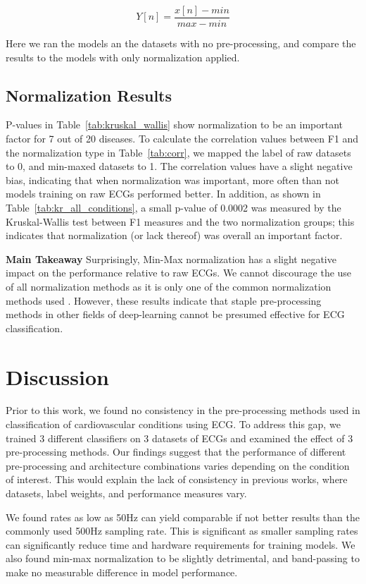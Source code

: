\documentclass[pmlr,twocolumn]{jmlr}%
\begin{document}
\[ Y[n] = \frac{x[n]-min}{max-min} \]

Here we ran the models an the datasets with no pre-processing, and compare the results to the models with only normalization applied.

\subsection{Normalization Results}
P-values in Table~\ref{tab:kruskal_wallis} show normalization to be an important factor for 7 out of 20 diseases. To calculate the correlation values between F1 and the normalization type in Table~\ref{tab:corr}, we mapped the label of raw datasets to 0, and min-maxed datasets to 1. The correlation values have a slight negative bias, indicating that when normalization was important, more often than not models training on raw ECGs performed better. In addition, as shown in Table~\ref{tab:kr_all_conditions}, a small p-value of 0.0002 was measured by the Kruskal-Wallis test between F1 measures and the two normalization groups; this indicates that normalization (or lack thereof) was overall an important factor.

\textbf{Main Takeaway} Surprisingly, Min-Max normalization has a slight negative impact on the performance relative to raw ECGs. We cannot discourage the use of all normalization methods as it is only one of the common normalization methods used \citep{uwaechia2021comprehensive}. However, these results indicate that staple pre-processing methods in other fields of deep-learning cannot be presumed effective for ECG classification.

\section{Discussion}
Prior to this work, we found no consistency in the pre-processing methods used in classification of cardiovascular conditions using ECG. To address this gap, we trained 3 different classifiers on 3 datasets of ECGs and examined the effect of 3 pre-processing methods. Our findings suggest that the performance of different pre-processing and architecture combinations varies depending on the condition of interest. This would explain the lack of consistency in previous works, where datasets, label weights, and performance measures vary. 

We found rates as low as 50Hz can yield comparable if not better results than the commonly used 500Hz sampling rate. This is significant as smaller sampling rates can significantly reduce time and hardware requirements for training models. We also found min-max normalization to be slightly detrimental, and band-passing to make no measurable difference in model performance.
\end{document}
